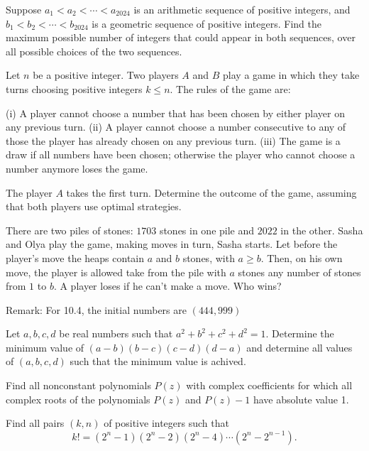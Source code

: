 \documentclass[11pt]{scrartcl}
\begin{document}
\begin{problem}[12311699525330]
	Suppose $a_{1} < a_{2}< \cdots < a_{2024}$ is an arithmetic sequence of positive integers, and $b_{1} <b_{2} < \cdots <b_{2024}$ is a geometric sequence of positive integers. Find the maximum possible number of integers that could appear in both sequences, over all possible choices of the two sequences.
\end{problem}
\begin{problem}[14852916670686]
Let $n$ be a positive integer. Two players $A$ and $B$ play a game in which they take turns choosing positive integers $k \le n$. The rules of the game are:

(i) A player cannot choose a number that has been chosen by either player on any previous turn.
(ii) A player cannot choose a number consecutive to any of those the player has already chosen on any previous turn.
(iii) The game is a draw if all numbers have been chosen; otherwise the player who cannot choose a number anymore loses the game.

The player $A$ takes the first turn. Determine the outcome of the game, assuming that both players use optimal strategies.
\end{problem}
\begin{problem}[15195306726194]
There are two piles of stones: $1703$ stones in one pile and $2022$ in the other. Sasha and Olya
play the game, making moves in turn, Sasha starts. Let before the player's move the heaps contain $a$ and $b$ stones, with $a \geq b$. Then, on his own move, the player is allowed take from the pile with $a$ stones any number of stones from $1$ to $b$. A player loses if he can't make a move. Who wins?

Remark: For 10.4, the initial numbers are $(444,999)$
\end{problem}
\begin{problem}[15317350224055]
Let $a,b,c,d$ be real numbers such that $a^2+b^2+c^2+d^2=1$. Determine the minimum value of $(a-b)(b-c)(c-d)(d-a)$ and determine all values of $(a,b,c,d)$ such that the minimum value is achived.
\end{problem}
\begin{problem}[16134758174084]
Find all nonconstant polynomials $P(z)$ with complex coefficients for which all complex roots of the polynomials $P(z)$ and $P(z) - 1$ have absolute value 1.

\end{problem}
\begin{problem}[16776483958513]
Find all pairs $(k,n)$ of positive integers such that\[ k!=(2^n-1)(2^n-2)(2^n-4)\cdots(2^n-2^{n-1}). \]
\end{problem}
\end{document}
